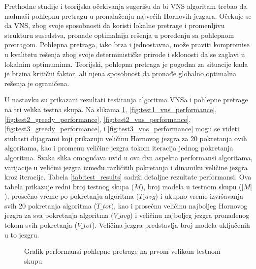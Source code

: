 \documentclass[12pt,oneside]{memoir}
\begin{document}
Prethodne studije i teorijska očekivanja sugerišu da bi VNS algoritam trebao da nadmaši pohlepnu pretragu u pronalaženju najvećih Hornovih jezgara. Očekuje se da VNS, zbog svoje sposobnosti da koristi lokalne pretrage i promenljivu strukturu susedstva, pronađe optimalnija rešenja u poređenju sa pohlepnom pretragom. Pohlepna pretraga, iako brza i jednostavna, može praviti kompromise u kvalitetu rešenja zbog svoje determinističke prirode i sklonosti da se zaglavi u lokalnim optimumima. Teorijski, pohlepna pretraga je pogodna za situacije kada je brzina kritični faktor, ali njena sposobnost da pronađe globalno optimalna rešenja je ograničena.

U nastavku su prikazani rezultati testiranja algoritma VNSa i pohlepne pretrage na tri velika testna skupa. Na slikama \ref{fig:test1_greedy_performance}, \ref{fig:test1_vns_performance}, \ref{fig:test2_greedy_performance}, \ref{fig:test2_vns_performance}, \ref{fig:test3_greedy_performance}, i \ref{fig:test3_vns_performance} mogu se videti stubasti dijagrami koji prikazuju veličinu Hornovog jezgra za 20 pokretanja ovih algoritama, kao i promenu veličine jezgra tokom iteracija jednog pokretanja algoritma. Svaka slika omogućava uvid u ova dva aspekta performansi algoritama, varijacije u veličini jezgra između različitih pokretanja i dinamiku veličine jezgra kroz iteracije. Tabela \ref{tab:test_results} sadrži detaljne rezultate performansi. Ova tabela prikazuje redni broj testnog skupa ($M$), broj modela u testnom skupu ($|M|$), prosečno vreme po pokretanju algoritma ($T\_avg$) i ukupno vreme izvršavanja svih 20 pokretanja algoritma ($T\_tot)$, kao i prosečnu veličinu najboljeg Hornovog jezgra za sva pokretanja algoritma ($V\_avg$) i veličinu najboljeg jezgra pronađenog tokom svih pokretanja ($V\_tot$). Veličina jezgra predstavlja broj modela uključenih u to jezgru.


\begin{figure}[H]
    \centering
    \hfill
    \caption{Grafik performansi pohlepne pretrage na prvom velikom testnom skupu}
    \label{fig:test1_greedy_performance}
\end{figure}
\end{document}
